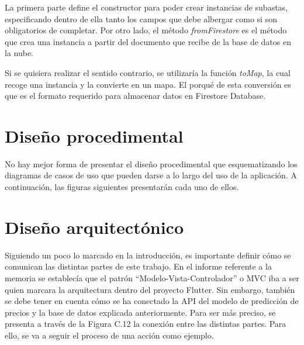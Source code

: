 
	La primera parte define el constructor para poder crear instancias de subastas, especificando dentro de ella tanto los campos que debe albergar como si son obligatorios de completar. Por otro lado, el método \emph{fromFirestore} es el método que crea una instancia a partir del documento que recibe de la base de datos en la nube.
	
	Si se quisiera realizar el sentido contrario, se utilizaría la función \emph{toMap}, la cual recoge una instancia y la convierte en un mapa. El porqué de esta conversión es que es el formato requerido para almacenar datos en Firestore Database.
	

\section{Diseño procedimental}

	No hay mejor forma de presentar el diseño procedimental que esquematizando los diagramas de casos de uso que pueden darse a lo largo del uso de la aplicación. A continuación, las figuras siguientes presentarán cada uno de ellos.

\section{Diseño arquitectónico}

	Siguiendo un poco lo marcado en la introducción, es importante definir cómo se comunican las distintas partes de este trabajo. En el informe referente a la memoria se establecía que el patrón ``Modelo-Vista-Controlador'' o MVC iba a ser quien marcara la arquitectura dentro del proyecto Flutter. Sin embargo, también se debe tener en cuenta cómo se ha conectado la API del modelo de predicción de precios y la base de datos explicada anteriormente.
	Para ser más preciso, se presenta a través de la Figura C.12 la conexión entre las distintas partes. Para ello, se va a seguir el proceso de una acción como ejemplo.


